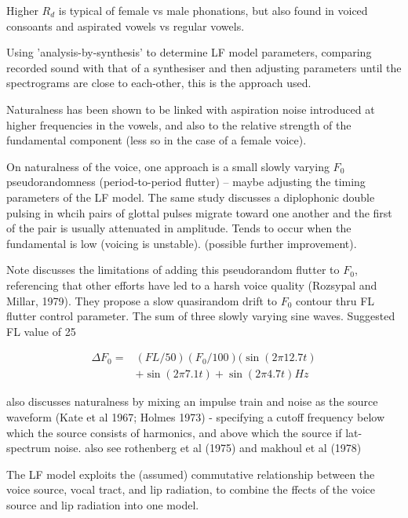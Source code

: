 Higher $R_d$ is typical of female vs male phonations, but also found in voiced consoants and aspirated vowels vs regular vowels. \cite{Fant1995}

Using 'analysis-by-synthesis' to determine LF model parameters, comparing recorded sound with that of a synthesiser and then adjusting parameters until the spectrograms are close to each-other, this is the approach used. \cite{Fant1995}

Naturalness has been shown to be linked with aspiration noise introduced at higher frequencies in the vowels, and also to the relative strength of the fundamental component (less so in the case of a female voice). \cite{Klatt1990}

On naturalness of the voice, one approach is a small slowly varying $F_0$ pseudorandomness \cite{Klatt1990} (period-to-period flutter) – maybe adjusting the timing parameters of the LF model. The same study discusses a diplophonic double pulsing in whcih pairs of glottal pulses migrate toward one another and the first of the pair is usually attenuated in amplitude. Tends to occur when the fundamental is low (voicing is unstable). (possible further improvement).

Note \cite{Klatt1990} discusses the limitations of adding this pseudorandom flutter to $F_0$, referencing that other efforts have led to a harsh voice quality (Rozsypal and Millar, 1979). They propose a slow quasirandom drift to $F_0$ contour thru FL flutter control parameter. The sum of three slowly varying sine waves. Suggested FL value of 25%

\begin{align}
\Delta F_0 = & (FL/50)(F_0/100)(\sin(2 \pi 12.7t) \\ 
& + \sin(2 \pi 7.1t) + \sin(2 \pi 4.7t) \si{Hz}
\end{align}

\cite{Klatt1990} also discusses naturalness by  mixing an impulse train and noise as the source waveform (Kate et al 1967; Holmes 1973) - specifying a cutoff frequency below which the source consists of harmonics, and above which the source if lat-spectrum noise. also see rothenberg et al (1975) and makhoul et al (1978)

The LF model exploits the (assumed) commutative relationship between the voice source, vocal tract, and lip radiation, to combine the ffects of the voice source and lip radiation into one model. \cite{DelPozo2008}
